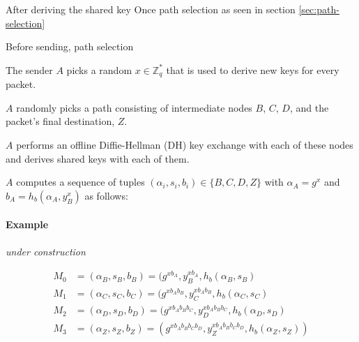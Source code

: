 

After deriving the shared key
Once path selection as seen in section \ref{sec:path-selection}

Before sending, path selection


The sender $A$ picks a random $x\in \mathbb{Z}^*_q$ that is used to derive new keys for every packet.

$A$ randomly picks a path consisting of intermediate nodes $B$, $C$, $D$, and the packet's final destination, $Z$.

$A$ performs an offline Diffie-Hellman (DH) key exchange with each of these nodes and derives shared keys with each of them.

$A$ computes a sequence of tuples $(\alpha_i,s_i,b_i) \in \{ B, C, D, Z \}$ with $\alpha_A = g^x$ and $b_A = h_b(\alpha_A, y_B^{x})$ as follows:

\paragraph{Example}

\textit{under construction}

\begin{align}
    \nonumber M_0 & =(\alpha_B,s_B,b_B) = (g^{x b_A},y_B^{x b_A},h_b(\alpha_B,s_B)                                    \\
    \nonumber M_1 & =(\alpha_C,s_C,b_C) = (g^{x b_A b_B},y_C^{x b_A b_B},h_b(\alpha_C,s_C)                            \\
    \nonumber M_2 & =(\alpha_D,s_D,b_D) = (g^{x b_A b_B b_C},y_D^{x b_A b_B b_C},h_b(\alpha_D,s_D)                    \\
    \nonumber M_3 & =(\alpha_Z,s_Z,b_Z)           = (g^{x b_A b_B b_C b_D},y_Z^{x b_A b_B b_C b_D},h_b(\alpha_Z,s_Z))
\end{align}

